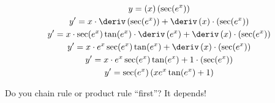 \begin{example}
    \begin{gather*}
        y = \left(x\right)\left(\sec(e^x)\right) \\
        y' = x \cdot \deriv \left(\sec(e^x)\right) + \deriv \left(x\right) \cdot \left(\sec(e^x)\right) \\
        y' = x \cdot \sec(e^x)\tan(e^x) \cdot \deriv\left(e^x\right) + \deriv \left(x\right) \cdot \left(\sec(e^x)\right) \\
        y' = x \cdot e^x \sec(e^x) \tan(e^x) + \deriv \left(x\right) \cdot \left(\sec(e^x)\right) \\
        y' = x \cdot e^x \sec(e^x) \tan(e^x) + 1 \cdot \left(\sec(e^x)\right) \\
        y' = \sec(e^x)\left(x e^x \tan(e^x) + 1\right)
    \end{gather*}
    \begin{note}
        Do you chain rule or product rule ``first''? It depends!
    \end{note}
\end{example}
